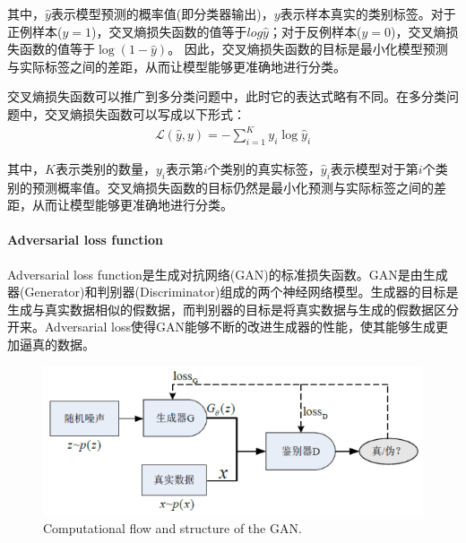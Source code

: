 \documentclass[letterpaper,12pt]{article}
\begin{document}
	其中，$\hat{y}$表示模型预测的概率值(即分类器输出)，$y$表示样本真实的类别标签。对于正例样本($y=1$)，交叉熵损失函数的值等于$log {\hat{y}}$；对于反例样本($y=0$)，交叉熵损失函数的值等于$\log (1-\hat{y})$。 因此，交叉熵损失函数的目标是最小化模型预测与实际标签之间的差距，从而让模型能够更准确地进行分类。 
	
	交叉熵损失函数可以推广到多分类问题中，此时它的表达式略有不同。在多分类问题中，交叉熵损失函数可以写成以下形式： 
	\begin{equation}
		\begin{aligned}
			\mathcal{L}(\hat{y},y)=-\sum_{i=1}^K y_i \log \hat{y}_i
		\end{aligned}
		\label{eq: revised_Cross-entropy loss}
	\end{equation} 
	
	其中，$K$表示类别的数量，$y_i$表示第$i$个类别的真实标签，$\hat{y}_i$表示模型对于第$i$个类别的预测概率值。交叉熵损失函数的目标仍然是最小化预测与实际标签之间的差距，从而让模型能够更准确地进行分类。
	
	\paragraph{Adversarial loss function}
	
	Adversarial loss function是生成对抗网络(GAN)的标准损失函数。GAN是由生成器(Generator)和判别器(Discriminator)组成的两个神经网络模型。生成器的目标是生成与真实数据相似的假数据，而判别器的目标是将真实数据与生成的假数据区分开来。Adversarial loss使得GAN能够不断的改进生成器的性能，使其能够生成更加逼真的数据。
	
	\begin{figure}[htbp] 
		\centering 
		\includegraphics[width=0.8\columnwidth]{GAN_architecture}
		\captionsetup{font=scriptsize}
		\caption{
			\label{fig: GAN_architecture} %
			Computational flow and structure of the GAN.
		}
	\end{figure}
	
\end{document}
